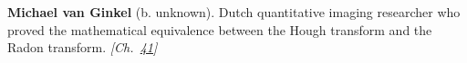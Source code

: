\textbf{Michael van Ginkel} (b. unknown). Dutch quantitative imaging researcher who proved the mathematical equivalence between the Hough transform and the Radon transform. \emph{[Ch.~\hyperref[ch:hough]{41}]}

